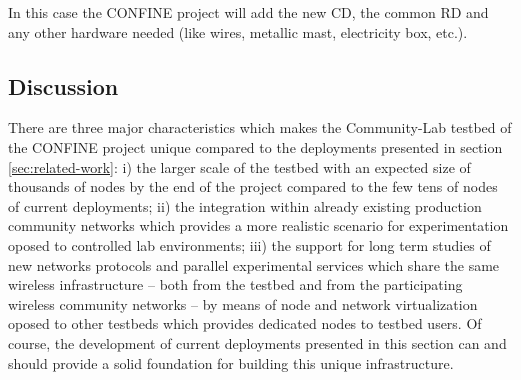 \documentclass[conference]{IEEEtran}
\begin{document}
In this case the CONFINE project will add the new CD, the common RD and any other hardware needed (like wires,
metallic mast, electricity box, etc.).








\subsection{Discussion}

There are three major characteristics which makes the Community-Lab
testbed of the CONFINE project unique compared to the deployments presented in section \ref{sec:related-work}: i) the 
larger scale of the testbed with an expected size of thousands of nodes by the end of the project compared to the few tens
of nodes of current deployments; ii) the integration within already existing production community networks which provides
a more realistic scenario for experimentation oposed to controlled lab environments; iii) the support for long term studies
of new networks protocols and parallel experimental services which share the same wireless infrastructure -- both from the testbed and from the participating wireless community networks -- by means of
node and network virtualization oposed to other testbeds which provides dedicated nodes to testbed users.
Of course, the development of current deployments presented in this section can and should provide a solid foundation for building
this unique infrastructure.
\end{document}
